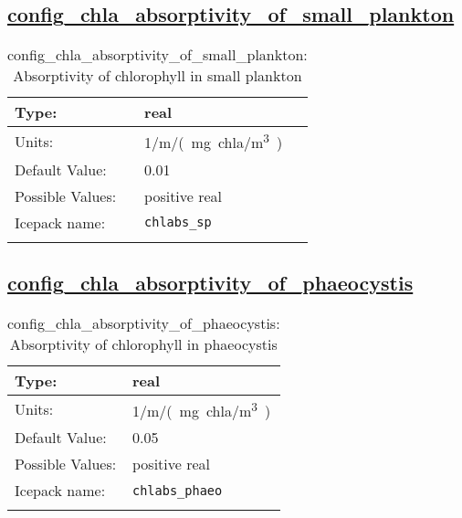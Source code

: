 \subsection[config\_chla\_absorptivity\_of\_small\_plankton]{\hyperref[sec:nm_tab_biogeochemistry]{config\_chla\_absorptivity\_of\_small\_plankton}}
\label{subsec:nm_sec_config_chla_absorptivity_of_small_plankton}
\begin{center}
\begin{longtable}{| p{2.0in} || p{4.0in} |}
    \hline
    Type: & real \\
    \hline
    Units: & \si{1/m/(mg.chla/m^3)} \\
    \hline
    Default Value: & 0.01 \\
    \hline
    Possible Values: & positive real \\
    \hline
    \hline
    Icepack name: & \verb+chlabs_sp+ \\
    \caption{config\_chla\_absorptivity\_of\_small\_plankton: Absorptivity of chlorophyll in small plankton}
\end{longtable}
\end{center}
\subsection[config\_chla\_absorptivity\_of\_phaeocystis]{\hyperref[sec:nm_tab_biogeochemistry]{config\_chla\_absorptivity\_of\_phaeocystis}}
\label{subsec:nm_sec_config_chla_absorptivity_of_phaeocystis}
\begin{center}
\begin{longtable}{| p{2.0in} || p{4.0in} |}
    \hline
    Type: & real \\
    \hline
    Units: & \si{1/m/(mg.chla/m^3)} \\
    \hline
    Default Value: & 0.05 \\
    \hline
    Possible Values: & positive real \\
    \hline
    \hline
    Icepack name: & \verb+chlabs_phaeo+ \\
    \caption{config\_chla\_absorptivity\_of\_phaeocystis: Absorptivity of chlorophyll in phaeocystis}
\end{longtable}
\end{center}
